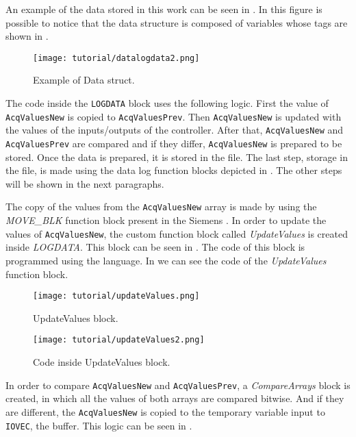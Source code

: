 An example of the data stored in this work can be seen in
. In this figure is possible to notice that the data structure is composed of variables whose tags are shown
in . 
\begin{figure}[H] \centering
 \texttt{[image: tutorial/datalogdata2.png]}
  \caption{Example of Data struct.}
  \label{fig:exampleDataStruct}
\end{figure}
The code inside the \verb|LOGDATA| block uses the following logic.
First the value of \verb|AcqValuesNew| is copied to \verb|AcqValuesPrev|. Then \verb|AcqValuesNew| is updated with the values of the inputs\slash outputs of the controller. After that, \verb|AcqValuesNew| and \verb|AcqValuesPrev| are compared and if they differ, \verb|AcqValuesNew| is prepared to be stored.
Once the data is prepared, it is stored in the file. 
The last step, storage in the file, is made using the data log function blocks depicted in
. The other steps will be shown
in the next paragraphs.

The copy of the values from the \verb|AcqValuesNew| array is made by using the \mbox{\emph{MOVE\_BLK}} function block present in the Siemens \PLC. 
In order to update the values of \verb|AcqValuesNew|, the custom function block called
\emph{UpdateValues} is created inside \emph{LOGDATA}. This block can be seen in
. The code of this block is programmed using the \SCL{} language. In  we
can see the code of the \mbox{\emph{UpdateValues}} function block.

\begin{figure}[H] \centering
 \texttt{[image: tutorial/updateValues.png]}
  \caption{UpdateValues block.}
  \label{fig:updateValuesBlock}
\end{figure}

\begin{figure}[H] \centering
 \texttt{[image: tutorial/updateValues2.png]}
  \caption{Code inside UpdateValues block.}
  \label{fig:updateValuesBlockCode}
\end{figure}

In order to compare \verb|AcqValuesNew| and \verb|AcqValuesPrev|, a
\emph{CompareArrays} block is created, in which all the values of both arrays are compared
bitwise. And if they are different, the
\verb|AcqValuesNew| is copied to the temporary variable input to \verb|IOVEC|, the buffer.
This logic can be seen in .

